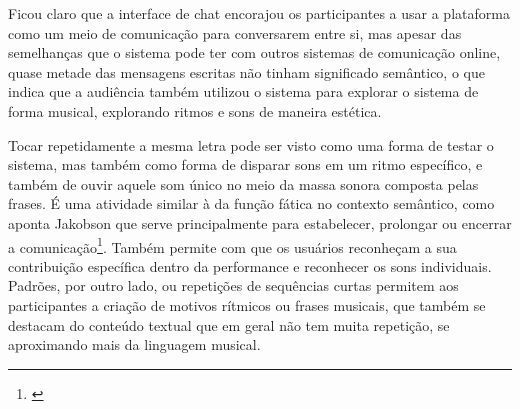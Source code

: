 
Ficou claro que a interface de chat encorajou os participantes a usar a plataforma como um meio de comunicação para conversarem entre si, mas apesar das semelhanças que o sistema pode ter com outros sistemas de comunicação online, quase metade das mensagens escritas não tinham significado semântico, o que indica que a audiência também utilizou o sistema para explorar o sistema de forma musical, explorando ritmos e sons de maneira estética.


Tocar repetidamente a mesma letra pode ser visto como uma forma de testar o sistema, mas também como forma de disparar sons em um ritmo específico, e também de ouvir aquele som único no meio da massa sonora composta pelas frases. É uma atividade similar à da função fática no contexto semântico, como aponta Jakobson que serve principalmente para estabelecer, prolongar ou encerrar a comunicação\footnote{\cite{Jakobson}}. Também permite com que os usuários reconheçam a sua contribuição específica dentro da performance e reconhecer os sons individuais. Padrões, por outro lado, ou repetições de sequências curtas permitem aos participantes a criação de motivos rítmicos ou frases musicais, que também se destacam do conteúdo textual que em geral não tem muita repetição, se aproximando mais da linguagem musical.


